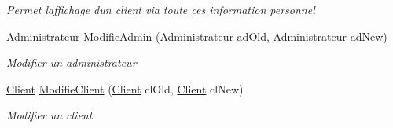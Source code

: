 \begin{DoxyCompactItemize}
\begin{DoxyCompactList}\small\item\em Permet l\textquotesingle{}affichage d\textquotesingle{}un client via toute ces information personnel \end{DoxyCompactList}\item 
\hyperlink{classModele_1_1Administrateur}{Administrateur} \hyperlink{classModele_1_1Manager_a155917f6e891c65745f967b80e384141}{Modifie\+Admin} (\hyperlink{classModele_1_1Administrateur}{Administrateur} ad\+Old, \hyperlink{classModele_1_1Administrateur}{Administrateur} ad\+New)
\begin{DoxyCompactList}\small\item\em Modifier un administrateur \end{DoxyCompactList}\item 
\hyperlink{classModele_1_1Client}{Client} \hyperlink{classModele_1_1Manager_a77509aff7cf7e4ada30cb64a2389f53b}{Modifie\+Client} (\hyperlink{classModele_1_1Client}{Client} cl\+Old, \hyperlink{classModele_1_1Client}{Client} cl\+New)
\begin{DoxyCompactList}\small\item\em Modifier un client \end{DoxyCompactList}\end{DoxyCompactItemize}
